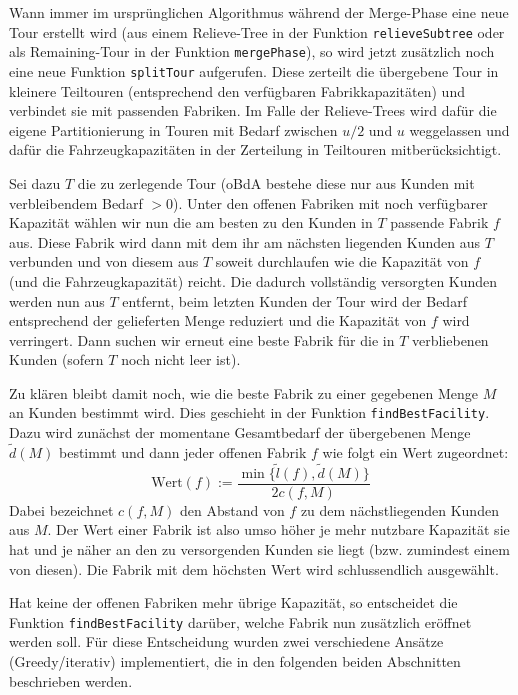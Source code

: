 \documentclass[a4paper,ngerman,11pt,bibtotoc]{scrartcl}
\theoremstyle{definition}
\theoremstyle{plain}
\theoremstyle{remark}
\begin{document}
	Wann immer im ursprünglichen Algorithmus während der Merge-Phase eine neue Tour erstellt wird (aus einem Relieve-Tree in der Funktion \lstinline|relieveSubtree| oder als Remaining-Tour in der Funktion \lstinline|mergePhase|), so wird jetzt zusätzlich noch eine neue Funktion \lstinline|splitTour| aufgerufen. Diese zerteilt die übergebene Tour in kleinere Teiltouren (entsprechend den verfügbaren Fabrikkapazitäten) und verbindet sie mit passenden Fabriken. Im Falle der Relieve-Trees wird dafür die eigene Partitionierung in Touren mit Bedarf zwischen $u/2$ und $u$ weggelassen und dafür die Fahrzeugkapazitäten in der Zerteilung in Teiltouren mitberücksichtigt.
	
	Sei dazu $T$ die zu zerlegende Tour (oBdA bestehe diese nur aus Kunden mit verbleibendem Bedarf $>0$). Unter den offenen Fabriken mit noch verfügbarer Kapazität wählen wir nun die \glqq am besten\grqq{} zu den Kunden in $T$ passende Fabrik $f$ aus. Diese Fabrik wird dann mit dem ihr am nächsten liegenden Kunden aus $T$ verbunden und von diesem aus $T$ soweit durchlaufen wie die Kapazität von $f$ (und die Fahrzeugkapazität) reicht. Die dadurch vollständig versorgten Kunden werden nun aus $T$ entfernt, beim letzten Kunden der Tour wird der Bedarf entsprechend der gelieferten Menge reduziert und die Kapazität von $f$ wird verringert. Dann suchen wir erneut eine \glqq beste Fabrik\grqq{} für die in $T$ verbliebenen Kunden (sofern $T$ noch nicht leer ist).
	
	Zu klären bleibt damit noch, wie die \glqq beste Fabrik\grqq{} zu einer gegebenen Menge $M$ an Kunden bestimmt wird. Dies geschieht in der Funktion \lstinline|findBestFacility|. Dazu wird zunächst der momentane Gesamtbedarf der übergebenen Menge $\tilde{d}(M)$ bestimmt und dann jeder offenen Fabrik $f$ wie folgt ein Wert zugeordnet:
	\[\text{Wert}(f) :=  \frac{\min\{\tilde{l}(f), \tilde{d}(M)\}}{2 c(f,M)}\]
	Dabei bezeichnet $c(f,M)$ den Abstand von $f$ zu dem nächstliegenden Kunden aus $M$. Der Wert einer Fabrik ist also umso höher je mehr nutzbare Kapazität sie hat und je näher an den zu versorgenden Kunden sie liegt (bzw. zumindest einem von diesen). Die Fabrik mit dem höchsten Wert wird schlussendlich ausgewählt.
	
	Hat keine der offenen Fabriken mehr übrige Kapazität, so entscheidet die Funktion \lstinline|findBestFacility| darüber, welche Fabrik nun zusätzlich eröffnet werden soll. Für diese Entscheidung wurden zwei verschiedene Ansätze (\glqq Greedy\grqq/\glqq iterativ\grqq) implementiert, die in den folgenden beiden Abschnitten beschrieben werden.		
\end{document}
